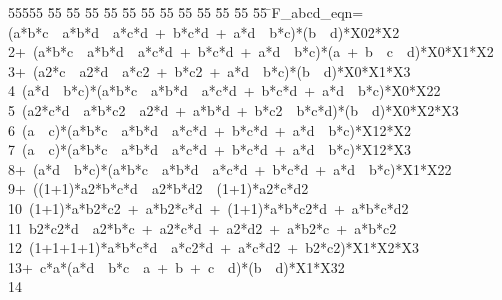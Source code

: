 %
%
\begin{tabbing}
55555 \= 55 \= 55 \= 55 \= 55 \= 55 \= 55 \= 55 \= 55 \= 55 \= 55 \= 55 \= 55 \= \>F\_abcd\_eqn=(a*b*c\ \ a*b*d\ \ a*c*d\ +\ b*c*d\ +\ a*d\ \ b*c)*(b\ \ d)*X02*X2\ \\[0pt]
2\>+\ (a*b*c\ \ a*b*d\ \ a*c*d\ +\ b*c*d\ +\ a*d\ \ b*c)*(a\ +\ b\ \ c\ \ d)*X0*X1*X2\ \\[0pt]
3\>+\ (a2*c\ \ a2*d\ \ a*c2\ +\ b*c2\ +\ a*d\ \ b*c)*(b\ \ d)*X0*X1*X3\ \\[0pt]
4\>\ (a*d\ \ b*c)*(a*b*c\ \ a*b*d\ \ a*c*d\ +\ b*c*d\ +\ a*d\ \ b*c)*X0*X22\ \\[0pt]
5\>\ (a2*c*d\ \ a*b*c2\ \ a2*d\ +\ a*b*d\ +\ b*c2\ \ b*c*d)*(b\ \ d)*X0*X2*X3\ \\[0pt]
6\>\ (a\ \ c)*(a*b*c\ \ a*b*d\ \ a*c*d\ +\ b*c*d\ +\ a*d\ \ b*c)*X12*X2\ \\[0pt]
7\>\ (a\ \ c)*(a*b*c\ \ a*b*d\ \ a*c*d\ +\ b*c*d\ +\ a*d\ \ b*c)*X12*X3\ \\[0pt]
8\>+\ (a*d\ \ b*c)*(a*b*c\ \ a*b*d\ \ a*c*d\ +\ b*c*d\ +\ a*d\ \ b*c)*X1*X22\ \\[0pt]
9\>+\ ((1+1)*a2*b*c*d\ \ a2*b*d2\ \ (1+1)*a2*c*d2\ \\[0pt]
10\>\ (1+1)*a*b2*c2\ +\ a*b2*c*d\ +\ (1+1)*a*b*c2*d\ +\ a*b*c*d2\ \\[0pt]
11\>\ b2*c2*d\ \ a2*b*c\ +\ a2*c*d\ +\ a2*d2\ +\ a*b2*c\ +\ a*b*c2\ \\[0pt]
12\>\ (1+1+1+1)*a*b*c*d\ \ a*c2*d\ +\ a*c*d2\ +\ b2*c2)*X1*X2*X3\ \\[0pt]
13\>+\ c*a*(a*d\ \ b*c\ \ a\ +\ b\ +\ c\ \ d)*(b\ \ d)*X1*X32\\[0pt]
14\>\end{tabbing}
